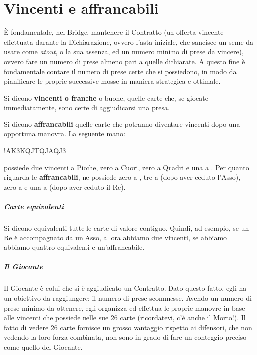\documentclass[../corsofiori.tex]{subfiles}
\begin{document}
\chapter{Vincenti e affrancabili}
\label{chap:lezione1}

\`E fondamentale, nel Bridge, mantenere il Contratto (un offerta vincente effettuata darante la Dichiarazione, ovvero
l'asta iniziale, che sancisce un seme da usare come \emph{atout}, o la sua assenza, ed un numero minimo di prese da
vincere), ovvero fare un numero di prese almeno pari a quelle dichiarate.
A questo fine è fondamentale contare il numero di prese certe che si possiedono, in modo da pianificare le proprie
successive mosse in maniera strategica e ottimale.

Si dicono \textbf{vincenti o franche} o buone, quelle carte che, se giocate immediatamente, sono certe di aggiudicarsi una
presa.

Si dicono \textbf{affrancabili} quelle carte che potranno diventare vincenti dopo una opportuna manovra.
La seguente mano:

\hand*!{AK3}{KQJT}{QJ}{AQJ3}


\noindent possiede due vincenti a Picche, zero a Cuori, zero a Quadri e una a \fio. Per quanto riguarda le \textbf{affrancabili}, ne
possiede zero a \pic, tre a \cu (dopo aver ceduto l'Asso), zero a \qu e una a \fio (dopo aver ceduto il Re).

\paragraph{Carte equivalenti} Si dicono equivalenti tutte le carte di valore contiguo. Quindi, ad esempio, se un
Re è accompagnato da un Asso, allora abbiamo due vincenti, se abbiamo  abbiamo quattro equivalenti
e un'affrancabile.

\paragraph{Il Giocante}
Il Giocante è colui che si è aggiudicato un Contratto. Dato questo fatto, egli ha un obiettivo da raggiungere: il
numero di prese scommesse. Avendo un numero di prese minimo da ottenere, egli organizza ed effettua le proprie manovre
in base alle vincenti che possiede nelle sue 26 carte (ricordatevi, c'è anche il Morto!). Il fatto di vedere 26 carte
fornisce un grosso vantaggio rispetto ai difensori, che non vedendo la loro forza combinata, non sono in grado di fare
un conteggio preciso come quello del Giocante.
\end{document}
